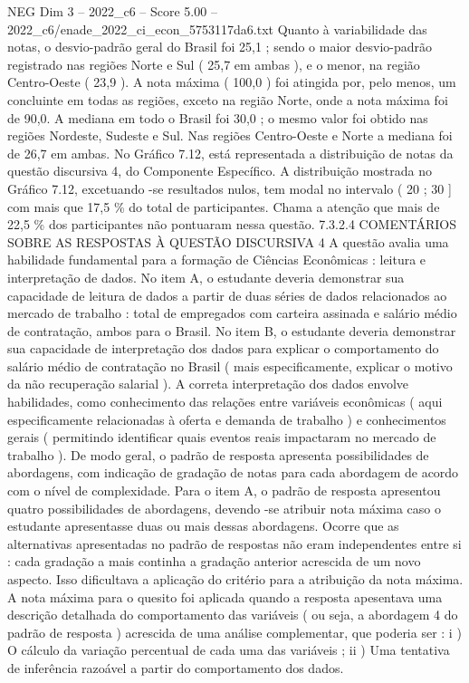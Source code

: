 \begin{textsample}{NEG Dim 3 – 2022\_c6 – Score 5.00 – 2022\_c6/enade\_2022\_ci\_econ\_5753117da6.txt}
Quanto à variabilidade das notas, o desvio-padrão geral do Brasil foi 25,1 ; sendo o maior desvio-padrão registrado nas regiões Norte e Sul ( 25,7 em ambas ), e o menor, na região Centro-Oeste ( 23,9 ).
A nota máxima ( 100,0 ) foi atingida por, pelo menos, um concluinte em todas as regiões, exceto na região Norte, onde a nota máxima foi de 90,0.
A mediana em todo o Brasil foi 30,0 ; o mesmo valor foi obtido nas regiões Nordeste, Sudeste e Sul.
Nas regiões Centro-Oeste e Norte a mediana foi de 26,7 em ambas.
No Gráfico 7.12, está representada a distribuição de notas da questão discursiva 4, do Componente Específico.
A distribuição mostrada no Gráfico 7.12, excetuando -se resultados nulos, tem modal no intervalo ( 20 ; 30 ] com mais que 17,5 \% do total de participantes.
Chama a atenção que mais de 22,5 \% dos participantes não pontuaram nessa questão. 7.3.2.4 COMENTÁRIOS SOBRE AS RESPOSTAS À QUESTÃO DISCURSIVA 4 A questão avalia uma habilidade fundamental para a formação de Ciências Econômicas : leitura e interpretação de dados.
No item A, o estudante deveria demonstrar sua capacidade de leitura de dados a partir de duas séries de dados relacionados ao mercado de trabalho : total de empregados com carteira assinada e salário médio de contratação, ambos para o Brasil.
No item B, o estudante deveria demonstrar sua capacidade de interpretação dos dados para explicar o comportamento do salário médio de contratação no Brasil ( mais especificamente, explicar o motivo da não recuperação salarial ).
A correta interpretação dos dados envolve habilidades, como conhecimento das relações entre variáveis econômicas ( aqui especificamente relacionadas à oferta e demanda de trabalho ) e conhecimentos gerais ( permitindo identificar quais eventos reais impactaram no mercado de trabalho ).
De modo geral, o padrão de resposta apresenta possibilidades de abordagens, com indicação de gradação de notas para cada abordagem de acordo com o nível de complexidade.
Para o item A, o padrão de resposta apresentou quatro possibilidades de abordagens, devendo -se atribuir nota máxima caso o estudante apresentasse duas ou mais dessas abordagens.
Ocorre que as alternativas apresentadas no padrão de respostas não eram independentes entre si : cada gradação a mais continha a gradação anterior acrescida de um novo aspecto.
Isso dificultava a aplicação do critério para a atribuição da nota máxima.
A nota máxima para o quesito foi aplicada quando a resposta apesentava uma descrição detalhada do comportamento das variáveis ( ou seja, a abordagem 4 do padrão de resposta ) acrescida de uma análise complementar, que poderia ser : i ) O cálculo da variação percentual de cada uma das variáveis ; ii ) Uma tentativa de inferência razoável a partir do comportamento dos dados.

\end{textsample}
